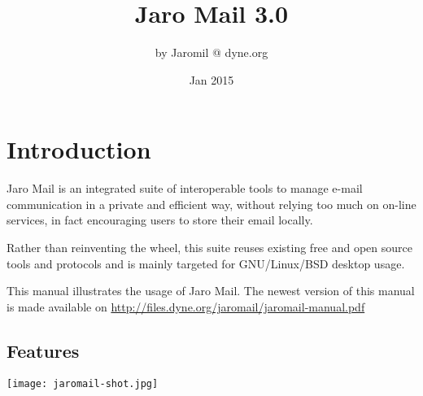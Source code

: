 \documentclass[a4,onecolumn,portrait]{article}
\author{by Jaromil @ dyne.org}
\date{Jan 2015}
\title{Jaro Mail 3.0}
\begin{document}
\maketitle
\tableofcontents

\fancyhf{}
\fancyfoot[C]{-- \thepage\ --}

\renewcommand{\headrulewidth}{0.4pt}
\renewcommand{\footrulewidth}{0.4pt}


\pagebreak


\section{Introduction}
\label{sec-1}

Jaro Mail is an integrated suite of interoperable tools to manage
e-mail communication in a private and efficient way, without relying
too much on on-line services, in fact encouraging users to store their
email locally.

Rather than reinventing the wheel, this suite reuses existing free and
open source tools and protocols and is mainly targeted for
GNU/Linux/BSD desktop usage.

This manual illustrates the usage of Jaro Mail. The newest version of
this manual is made available on \url{http://files.dyne.org/jaromail/jaromail-manual.pdf}

\subsection{Features}
\label{sec-1-1}

\texttt{[image: jaromail-shot.jpg]}
\end{document}
